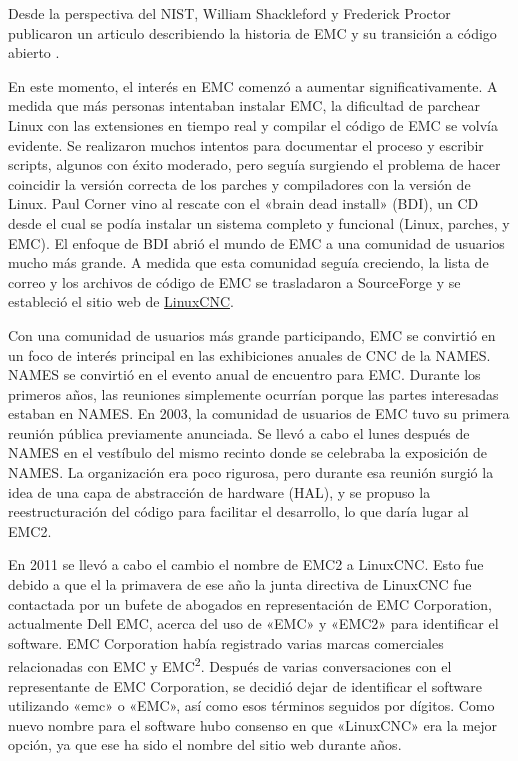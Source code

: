 \documentclass[english,spanish,a4paper,11pt]{article}
\begin{document}
Desde la perspectiva del \ac{NIST}, William Shackleford y Frederick Proctor publicaron un articulo describiendo la historia de \ac{EMC} y su transición a código abierto \cite{shackleford2001use}.

En este momento, el interés en \ac{EMC} comenzó a aumentar significativamente. A medida que más personas intentaban instalar \ac{EMC}, la dificultad de parchear Linux con las extensiones en tiempo real y compilar el código de \ac{EMC} se volvía evidente. Se realizaron muchos intentos para documentar el proceso y escribir scripts, algunos con éxito moderado, pero seguía surgiendo el problema de hacer coincidir la versión correcta de los parches y compiladores con la versión de Linux. Paul Corner vino al rescate con el «brain dead install» (BDI), un CD desde el cual se podía instalar un sistema completo y funcional (Linux, parches, y \ac{EMC}). El enfoque de BDI abrió el mundo de \ac{EMC} a una comunidad de usuarios mucho más grande. A medida que esta comunidad seguía creciendo, la lista de correo y los archivos de código de \ac{EMC} se trasladaron a SourceForge y se estableció el sitio web de \href{https://linuxcnc.org}{LinuxCNC}.

Con una comunidad de usuarios más grande participando, \ac{EMC} se convirtió en un foco de interés principal en las exhibiciones anuales de \ac{CNC} de la \ac{NAMES}. \ac{NAMES} se convirtió en el evento anual de encuentro para \ac{EMC}. Durante los primeros años, las reuniones simplemente ocurrían porque las partes interesadas estaban en \ac{NAMES}. En 2003, la comunidad de usuarios de \ac{EMC} tuvo su primera reunión pública previamente anunciada. Se llevó a cabo el lunes después de \ac{NAMES} en el vestíbulo del mismo recinto donde se celebraba la exposición de \ac{NAMES}. La organización era poco rigurosa, pero durante esa reunión surgió la idea de una capa de abstracción de hardware (\ac{HAL}), y se propuso la reestructuración del código para facilitar el desarrollo, lo que daría lugar al \ac{EMC2}.

En 2011 se llevó a cabo el cambio el nombre de \ac{EMC2} a LinuxCNC. Esto fue debido a que el la primavera de ese año la junta directiva de LinuxCNC fue contactada por un bufete de abogados en representación de EMC Corporation, actualmente Dell EMC, acerca del uso de «EMC» y «EMC2» para identificar el software. EMC Corporation había registrado varias marcas comerciales relacionadas con EMC y EMC\textsuperscript{2}. Después de varias conversaciones con el representante de EMC Corporation, se decidió dejar de identificar el software utilizando «emc» o «EMC», así como esos términos seguidos por dígitos. Como nuevo nombre para el software hubo consenso en que «LinuxCNC» era la mejor opción, ya que ese ha sido el nombre del sitio web durante años.
\end{document}
